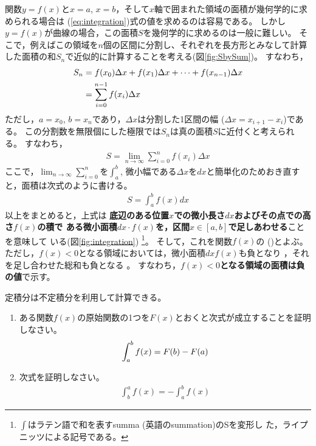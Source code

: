 \documentclass[twocolumn,11pt]{jarticle}
\begin{document}
関数$y=f(x)$と$x=a$, $x=b$，そして$x$軸で囲まれた領域の面積が幾何学的に求められる場合は
(\ref{eq:integration})式の値を求めるのは容易である。
しかし$y=f(x)$が曲線の場合，この面積$S$を幾何学的に求めるのは一般に難しい。
そこで，例えばこの領域を$n$個の区間に分割し、それぞれを長方形とみなして計算
した面積の和$S_n$で近似的に計算することを考える(図\ref{fig:SbySum})。
すなわち，
\begin{align}
  S_n&=f(x_0)\Delta x+f(x_1)\Delta x+\cdots+f(x_{n-1})\Delta x\notag\\
  &=\sum_{i=0}^{n-1}f(x_i)\Delta x
\end{align}
ただし，$a=x_0$, $b=x_n$であり，$\Delta x$は分割した1区間の幅
($\Delta x=x_{i+1}-x_i$)である。
この分割数を無限個にした極限では$S_n$は真の面積$S$に近付くと考えられる。
すなわち，
\begin{align*}
  S=\lim_{n\to \infty}\sum_{i=0}^nf(x_i)\Delta x
\end{align*}
ここで，$\displaystyle\lim_{n\to \infty}\sum_{i=0}^n$を$\displaystyle\int_a^b$,
微小幅である$\Delta x$を$dx$と簡単化のためおき直すと，面積は次式のように書ける。
\begin{align}
\label{eq:integration2}
  S=\int_a^bf(x)dx
\end{align}
以上をまとめると，上式は
\textbf{底辺のある位置$x$での微小長さ$dx$およびその点での高さ$f(x)$の積で
ある微小面積$dx\cdot f(x)$を，区間$x\in[a,b]$で足しあわせる}ことを意味して
いる(図\ref{fig:integration})
\footnote{$\int$はラテン語で和を表すsumma (英語のsummation)のSを変形し
  た，ライプニッツによる記号である。}。
そして，これを関数$f(x)$の
()とよぶ。
ただし，$f(x)<0$となる領域においては，微小面積$dx f(x)$も負となり ，それを足し合わせた総和も負となる 。
すなわち，\textbf{$f(x)<0$となる領域の面積は負の値}で示す。

\question
定積分は不定積分を利用して計算できる。
\begin{enumerate}
\item ある関数$f(x)$の原始関数の1つを$F(x)$とおくと次式が成立することを証明しなさい。
\begin{align}
  \int_a^bf(x)=F(b)-F(a)\notag
\end{align}
\item 次式を証明しなさい。
\begin{align}
  \int_b^af(x)=-\int_a^bf(x)
\end{align}
\end{enumerate}
\end{document}
